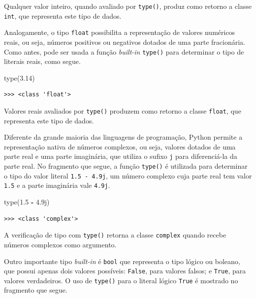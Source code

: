 \documentclass[
]{book}
\newenvironment{Shaded}{\begin{snugshade}}{\end{snugshade}}
\newcommand{\BuiltInTok}[1]{#1}
\newcommand{\FloatTok}[1]{\textcolor[rgb]{0.00,0.00,0.81}{#1}}
\newcommand{\NormalTok}[1]{#1}
\newcommand{\OperatorTok}[1]{\textcolor[rgb]{0.81,0.36,0.00}{\textbf{#1}}}
\newcommand{\OtherTok}[1]{\textcolor[rgb]{0.56,0.35,0.01}{#1}}
\begin{document}
Qualquer valor inteiro, quando avaliado por \texttt{type()}, produz como retorno a classe \texttt{int}, que representa este tipo de dados.

Analogamente, o tipo \texttt{float} possibilita a representação de valores numéricos reais, ou seja, números positivos ou negativos dotados de uma parte fracionária. Como antes, pode ser usada a função \emph{built-in} \texttt{type()} para determinar o tipo de literais reais, como segue.

\begin{Shaded}
\begin{Highlighting}[]
\BuiltInTok{type}\NormalTok{(}\FloatTok{3.14}\NormalTok{)}
\end{Highlighting}
\end{Shaded}

\begin{verbatim}
>>> <class 'float'>
\end{verbatim}

Valores reais avaliados por \texttt{type()} produzem como retorno a classe \texttt{float}, que representa este tipo de dados.

Diferente da grande maioria das linguagens de programação, Python permite a representação nativa de números complexos, ou seja, valores dotados de uma parte real e uma parte imaginária, que utiliza o sufixo \texttt{j} para diferenciá-la da parte real. No fragmento que segue, a função \texttt{type()} é utilizada para determinar o tipo do valor literal \texttt{1.5\ -\ 4.9j}, um número complexo cuja parte real tem valor \texttt{1.5} e a parte imaginária vale \texttt{4.9j}.

\begin{Shaded}
\begin{Highlighting}[]
\BuiltInTok{type}\NormalTok{(}\FloatTok{1.5} \OperatorTok{{-}} \OtherTok{4.9j}\NormalTok{)}
\end{Highlighting}
\end{Shaded}

\begin{verbatim}
>>> <class 'complex'>
\end{verbatim}

A verificação de tipo com \texttt{type()} retorna a classe \texttt{complex} quando recebe números complexos como argumento.

Outro importante tipo \emph{built-in} é \texttt{bool} que representa o tipo lógico ou boleano, que possui apenas dois valores possíveis: \texttt{False}, para valores falsos; e \texttt{True}, para valores verdadeiros. O uso de \texttt{type()} para o literal lógico \texttt{True} é mostrado no fragmento que segue.
\end{document}
